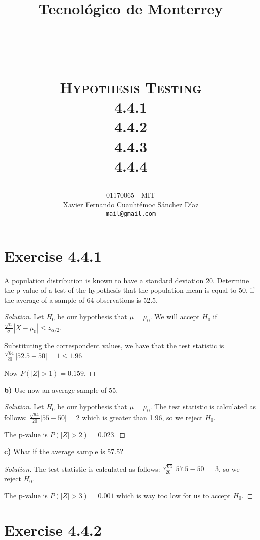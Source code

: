 \documentclass[titlepage, letterpaper, fleqn]{article}
\title{
\vspace{1in}
\textbf{Tecnológico de Monterrey} \\
\vspace{0.5in}
\textmd{\mahclass} \\
\large{\textit{\mahteacher}} \\
\vspace{0.5in}
\textsc{\mahtitle}\\
\textsc{Hypothesis Testing}\\
\textsc{4.4.1}\\
\textsc{4.4.2}\\
\textsc{4.4.3}\\
\textsc{4.4.4}\\
\author{01170065  - MIT \\
Xavier Fernando Cuauhtémoc Sánchez Díaz \\
\texttt{mail@gmail.com}}
\date{\mahdate}
}
\newcommand{\spacepls}{\vspace{5mm}}
\renewcommand\qedsymbol{\(\blacksquare\)}
\newenvironment{solution}
{\renewcommand\qedsymbol{$\square$}\begin{proof}[Solution]}
{\end{proof}}
\begin{document}
\begin{titlepage}
\maketitle
\end{titlepage}

%
%

\section{Exercise 4.4.1}

{\large A population distribution is known to have a standard deviation 20.
Determine the p-value of a test of the hypothesis that the population mean is equal to 50, if the average of a sample of 64 observations is 52.5.}

\begin{solution}
Let $H_0$ be our hypothesis that $\mu = \mu_0$.
We will accept $H_0$ if $\frac{\sqrt{n}}{\sigma}|\overline{X}-\mu_0| \leq z_{\alpha/2}$.

Substituting the correspondent values, we have that the test statistic is $\frac{\sqrt{64}}{20}|52.5-50| = 1 \leq 1.96$

Now $P(|Z| > 1) = 0.159$.
\end{solution}

\spacepls

{\large \textbf{b)} Use now an average sample of 55.}

\begin{solution}
Let $H_0$ be our hypothesis that $\mu = \mu_0$.
The test statistic is calculated as follows: $\frac{\sqrt{64}}{20}|55-50| = 2$ which is greater than 1.96, so we reject $H_0$.

The p-value is $P(|Z| > 2) = 0.023$.
\end{solution}

\spacepls

{\large \textbf{c)} What if the average sample is 57.5?}

\begin{solution}
The test statistic is calculated as follows: $\frac{\sqrt{64}}{20}|57.5-50| = 3$, so we reject $H_0$.

The p-value is $P(|Z| > 3) = 0.001$ which is way too low for us to accept $H_0$.
\end{solution}

\spacepls

\section{Exercise 4.4.2}
\end{document}
